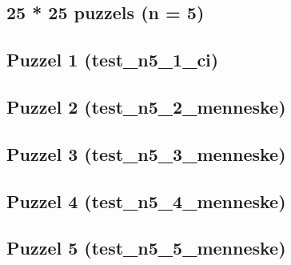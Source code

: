 \documentclass[]{report}
\begin{document}
\begin{appendices}
\section{25 * 25 puzzels (n = 5)}
\subsection{Puzzel 1 (test\_n5\_1\_ci)}

\subsection{Puzzel 2 (test\_n5\_2\_menneske)}
\subsection{Puzzel 3 (test\_n5\_3\_menneske)}
\subsection{Puzzel 4 (test\_n5\_4\_menneske)}
\subsection{Puzzel 5 (test\_n5\_5\_menneske)}

\end{appendices}
\end{document}
